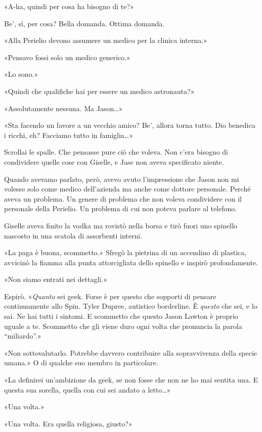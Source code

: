 «A-ha, quindi per cosa ha bisogno di te?»

Be', sì, per cosa? Bella domanda. Ottima domanda.

«Alla Perielio devono assumere un medico per la clinica interna.»

«Pensavo fossi solo un medico generico.»

«Lo sono.»

«Quindi che qualifiche hai per essere un medico astronauta?»

«Assolutamente nessuna. Ma Jason\ldots»

«Sta facendo un favore a un vecchio amico? Be', allora torna tutto. Dio
benedica i ricchi, eh? Facciamo tutto in famiglia\ldots»

Scrollai le spalle. Che pensasse pure ciò che voleva. Non c'era bisogno
di condividere quelle cose con Giselle, e Jase non aveva specificato
niente.

Quando avevamo parlato, però, avevo avuto l'impressione che Jason non mi
volesse solo come medico dell'azienda ma anche come dottore personale.
Perché aveva un problema. Un genere di problema che non voleva
condividere con il personale della Perielio. Un problema di cui non
poteva parlare al telefono.

Giselle aveva finito la vodka ma rovistò nella borsa e tirò fuori uno
spinello nascosto in una scatola di assorbenti interni.

«La paga è buona, scommetto.» Sfregò la pietrina di un accendino di
plastica, avvicinò la fiamma alla punta attorcigliata dello spinello e
inspirò profondamente.

«Non siamo entrati nei dettagli.»

Espirò. «\emph{Quanto} sei geek. Forse è per questo che sopporti di
pensare continuamente allo Spin. Tyler Dupree, autistico borderline. È
\emph{questo} che sei, e lo sai. Ne hai tutti i sintomi. E scommetto che
questo Jason Lawton è proprio uguale a te. Scommetto che gli viene duro
ogni volta che pronuncia la parola ``miliardo''.»

«Non sottovalutarlo. Potrebbe davvero contribuire alla sopravvivenza
della specie umana.» O di qualche suo membro in particolare.

«La definirei un'ambizione da geek, se non fosse che non ne ho mai
sentita una. E questa sua sorella, quella con cui sei andato a
letto\ldots»

«Una volta.»

«Una volta. Era quella religiosa, giusto?»

